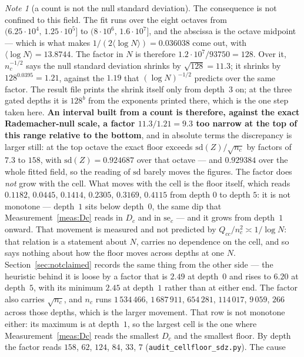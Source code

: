 \documentclass[11pt,a4paper]{article}
\theoremstyle{plain}
\theoremstyle{definition}
\theoremstyle{remark}
\newtheorem{note}[theorem]{Note}
\begin{document}
\begin{note}[a count is not the null standard deviation]\label{note:notanerrorbar}
The consequence is not confined to this field. The fit runs over the
eight octaves from $(6.25\cdot10^4,\,1.25\cdot10^5]$ to
$(8\cdot10^6,\,1.6\cdot10^7]$, and the abscissa is the octave midpoint
--- which is what makes $1/(2\langle\log N\rangle)=0.036038$ come out,
with $\langle\log N\rangle=13.8744$. The factor in $N$ is therefore
$1.2\cdot10^7/93750=128$. Over it, $n_c^{-1/2}$ says the null
standard deviation shrinks by $\sqrt{128}=11.3$; it shrinks by $128^{0.0395}=1.21$,
against the $1.19$ that $(\log N)^{-1/2}$ predicts over the same
factor. The result file prints the shrink itself only from depth~$3$
on; at the three gated depths it is $128^b$ from the exponents printed
there, which is the one step taken here. \textbf{An interval built
from a count is therefore, against the exact Rademacher-null scale, a
factor $11.3/1.21=9.3$ too narrow at the top of this range relative to
the bottom}, and in absolute terms the discrepancy is larger still:
at the top octave the exact floor exceeds
$\mathrm{sd}(Z)/\sqrt{n_c}$ by factors of $7.3$ to $158$, with
$\mathrm{sd}(Z)=0.924687$ over that octave --- and $0.929384$ over the
whole fitted field, so the reading of $\mathrm{sd}$ barely moves the
figures. The factor does \emph{not} grow with the cell. What moves with
the cell is the floor itself, which reads $0.1182$, $0.0445$, $0.1414$,
$0.2305$, $0.3169$, $0.4115$ from depth $0$ to depth $5$: it is not
monotone --- depth~$1$ sits below depth~$0$, the same dip that
Measurement~\ref{meas:Dc} reads in $D_c$ and in $\mathrm{se}_c$ --- and
it grows from depth~$1$ onward. That movement is measured and not
predicted by
$Q_{cc}/n_c^2\asymp1/\log N$: that relation is a statement about $N$,
carries no dependence on the cell, and so says nothing about how the
floor moves across depths at one $N$. Section~\ref{sec:notclaimed}
records the same thing from the other side --- the heuristic behind it
is loose by a factor that is $2.49$ at depth~$0$ and rises to $6.20$ at
depth~$5$, with its minimum $2.45$ at depth~$1$ rather than at either
end. The factor
also carries $\sqrt{n_c}$, and $n_c$ runs $1\,534\,466$,
$1\,687\,911$, $654\,281$, $114\,017$, $9\,059$, $266$ across those
depths, which is the larger movement. That row is not monotone either:
its maximum is at depth~$1$, so the largest cell is the one where
Measurement~\ref{meas:Dc} reads the smallest $D_c$ and the smallest
floor. By depth the
factor reads $158$, $62$, $124$, $84$, $33$, $7$
(\texttt{audit\_cellfloor\_sdz.py}). The cause

\end{note}
\end{document}
